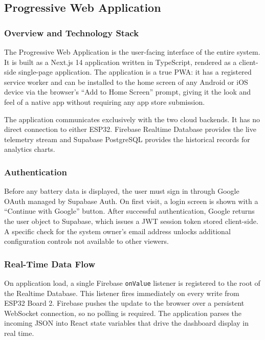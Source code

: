 \documentclass[12pt, a4paper]{report}
\begin{document}
{\subsection{Progressive Web Application}

\subsubsection{Overview and Technology Stack}

The Progressive Web Application is the user-facing interface of the entire
system. It is built as a Next.js 14 application written in TypeScript,
rendered as a client-side single-page application. The application is a
true PWA: it has a registered service worker and can be installed to the
home screen of any Android or iOS device via the browser's ``Add to Home
Screen'' prompt, giving it the look and feel of a native app without requiring
any app store submission.

The application communicates exclusively with the two cloud backends. It has
no direct connection to either ESP32. Firebase Realtime Database provides the
live telemetry stream and Supabase PostgreSQL provides the historical records
for analytics charts.

\subsubsection{Authentication}

Before any battery data is displayed, the user must sign in through Google
OAuth managed by Supabase Auth. On first visit, a login screen is shown with
a ``Continue with Google'' button. After successful authentication, Google
returns the user object to Supabase, which issues a JWT session token stored
client-side. A specific check for the system owner's email address unlocks
additional configuration controls not available to other viewers.

\subsubsection{Real-Time Data Flow}

On application load, a single Firebase \texttt{onValue} listener is registered
to the root of the Realtime Database. This listener fires immediately on every
write from ESP32 Board 2. Firebase pushes the update to the browser over a
persistent WebSocket connection, so no polling is required. The application
parses the incoming JSON into React state variables that drive the dashboard
display in real time.

}
\end{document}
